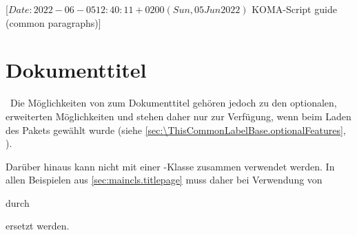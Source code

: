 %
%
%
%
%
%
%

                 [$Date: 2022-06-05 12:40:11 +0200 (Sun, 05 Jun 2022) $
                  KOMA-Script guide (common paragraphs)]

\section{Dokumenttitel}
%
\BeginIndexGroup
{}%

%
\IfThisCommonLabelBase{scrextend}{\iftrue}{\csname iffalse\endcsname}%
  \ Die Möglichkeiten von  zum
  Dokumenttitel gehören jedoch zu den optionalen, erweiterten Möglichkeiten
  und stehen daher nur zur Verfügung, wenn beim Laden des Pakets
   gewählt
  wurde (siehe \autoref{sec:\ThisCommonLabelBase.optionalFeatures},
  ).

  Darüber hinaus kann  nicht mit einer \KOMAScript-Klasse
  zusammen verwendet werden. In allen Beispielen aus
  \autoref{sec:maincls.titlepage} muss daher bei Verwendung von
durch
  ersetzt werden.
\fi

